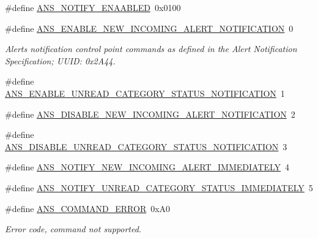 \begin{DoxyCompactItemize}
\#define \hyperlink{group___b_l_e___a_n_s_ga615915b560b0979ff591311e436e979c}{A\+N\+S\+\_\+\+N\+O\+T\+I\+F\+Y\+\_\+\+E\+N\+A\+A\+B\+L\+ED}~0x0100
\item 
\#define \hyperlink{group___b_l_e___a_n_s_gaa85a92c40f8ea796f19b099b975e752d}{A\+N\+S\+\_\+\+E\+N\+A\+B\+L\+E\+\_\+\+N\+E\+W\+\_\+\+I\+N\+C\+O\+M\+I\+N\+G\+\_\+\+A\+L\+E\+R\+T\+\_\+\+N\+O\+T\+I\+F\+I\+C\+A\+T\+I\+ON}~0
\begin{DoxyCompactList}\small\item\em Alerts notification control point commands as defined in the Alert Notification Specification; U\+U\+ID\+: 0x2\+A44. \end{DoxyCompactList}\item 
\#define \hyperlink{group___b_l_e___a_n_s_ga36f4324d646ba4ce30b9c6342d02d97e}{A\+N\+S\+\_\+\+E\+N\+A\+B\+L\+E\+\_\+\+U\+N\+R\+E\+A\+D\+\_\+\+C\+A\+T\+E\+G\+O\+R\+Y\+\_\+\+S\+T\+A\+T\+U\+S\+\_\+\+N\+O\+T\+I\+F\+I\+C\+A\+T\+I\+ON}~1
\item 
\#define \hyperlink{group___b_l_e___a_n_s_gaf92f48e87216782c28b2cfe0c4724ee6}{A\+N\+S\+\_\+\+D\+I\+S\+A\+B\+L\+E\+\_\+\+N\+E\+W\+\_\+\+I\+N\+C\+O\+M\+I\+N\+G\+\_\+\+A\+L\+E\+R\+T\+\_\+\+N\+O\+T\+I\+F\+I\+C\+A\+T\+I\+ON}~2
\item 
\#define \hyperlink{group___b_l_e___a_n_s_gadce3c6087668f98cc360a6df356bc5ad}{A\+N\+S\+\_\+\+D\+I\+S\+A\+B\+L\+E\+\_\+\+U\+N\+R\+E\+A\+D\+\_\+\+C\+A\+T\+E\+G\+O\+R\+Y\+\_\+\+S\+T\+A\+T\+U\+S\+\_\+\+N\+O\+T\+I\+F\+I\+C\+A\+T\+I\+ON}~3
\item 
\#define \hyperlink{group___b_l_e___a_n_s_gab6554594b4e928836ba1a5dd69731155}{A\+N\+S\+\_\+\+N\+O\+T\+I\+F\+Y\+\_\+\+N\+E\+W\+\_\+\+I\+N\+C\+O\+M\+I\+N\+G\+\_\+\+A\+L\+E\+R\+T\+\_\+\+I\+M\+M\+E\+D\+I\+A\+T\+E\+LY}~4
\item 
\#define \hyperlink{group___b_l_e___a_n_s_gac985b3d676fe04cdafdde4673d3a471e}{A\+N\+S\+\_\+\+N\+O\+T\+I\+F\+Y\+\_\+\+U\+N\+R\+E\+A\+D\+\_\+\+C\+A\+T\+E\+G\+O\+R\+Y\+\_\+\+S\+T\+A\+T\+U\+S\+\_\+\+I\+M\+M\+E\+D\+I\+A\+T\+E\+LY}~5
\item 
\#define \hyperlink{group___b_l_e___a_n_s_ga2fb5147aad42537bdc849fe47966da5f}{A\+N\+S\+\_\+\+C\+O\+M\+M\+A\+N\+D\+\_\+\+E\+R\+R\+OR}~0x\+A0\hypertarget{group___b_l_e___a_n_s_ga2fb5147aad42537bdc849fe47966da5f}{}\label{group___b_l_e___a_n_s_ga2fb5147aad42537bdc849fe47966da5f}

\begin{DoxyCompactList}\small\item\em Error code, command not supported. \end{DoxyCompactList}\end{DoxyCompactItemize}
